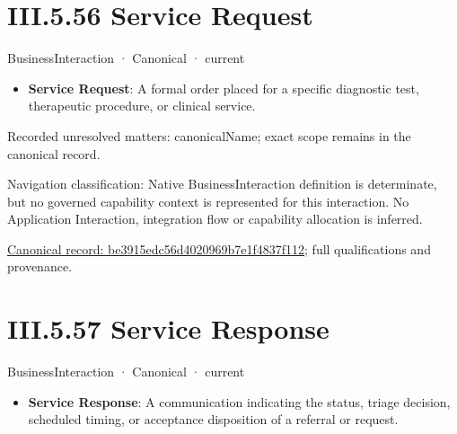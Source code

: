 \section*{III.5.56 Service Request}
\label{navigation:III.5.56}

\label{element:be3915edc56d4020969b7e1f4837f112}
{\small BusinessInteraction · Canonical · current}\par

\begin{itemize}


\item \textbf{Service Request}: A formal order placed for a specific diagnostic test, therapeutic procedure, or clinical service.

\end{itemize}

{\small Recorded unresolved matters: canonicalName; exact scope remains in the canonical record.}\par
{\small Navigation classification: Native BusinessInteraction definition is determinate, but no governed capability context is represented for this interaction. No Application Interaction, integration flow or capability allocation is inferred.}\par
{\footnotesize \href{../../../../../../../continuum/business/business-interaction/be3915edc56d4020969b7e1f4837f112.md}{Canonical record: be3915edc56d4020969b7e1f4837f112}; full qualifications and provenance.}\par
\section*{III.5.57 Service Response}
\label{navigation:III.5.57}

\label{element:6bc0e6df5ba3405a9037e34f9810aefc}
{\small BusinessInteraction · Canonical · current}\par

\begin{itemize}


\item \textbf{Service Response}: A communication indicating the status, triage decision, scheduled timing, or acceptance disposition of a referral or request.

\end{itemize}

